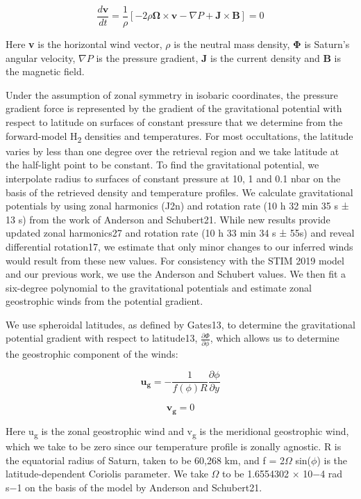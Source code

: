 \begin{equation}
	\frac{d\mathbf{v}}{dt} = \frac{1}{\rho} [-2 \rho \mathbf{\Omega} \times \mathbf{v} - \nabla P + \mathbf{J} \times \mathbf{B}] = 0
\end{equation}

Here \textbf{v} is the horizontal wind vector, $\rho$ is the neutral mass density, $\mathbf{\Phi}$ is Saturn’s angular velocity, $\nabla P$ is the pressure gradient, \textbf{J} is the current density and \textbf{B} is the magnetic field.

Under the assumption of zonal symmetry in isobaric coordinates, the pressure gradient force is represented by the gradient of the gravitational potential with respect to latitude on surfaces of constant pressure that we determine from the forward-model H\textsubscript{2} densities and temperatures. For most occultations, the latitude varies by less than one degree over the retrieval region and we take latitude at the half-light point to be constant. To find the gravitational potential, we interpolate radius to surfaces of constant pressure at 10, 1 and 0.1 nbar on the basis of the retrieved density and temperature profiles. We calculate gravitational potentials by using zonal harmonics (J2n) and rotation rate (10 h 32 min 35 s ± 13 s) from the work of Anderson and Schubert21. While new results provide updated zonal harmonics27 and rotation rate (10 h 33 min 34 s ± 55s) and reveal differential rotation17, we estimate that only minor changes to our inferred winds would result from these new values. For consistency with the STIM 2019 model and our previous work, we use the Anderson and Schubert values. We then fit a six-degree polynomial to the gravitational potentials and estimate zonal geostrophic winds from the potential gradient.

We use spheroidal latitudes, as defined by Gates13, to determine the gravitational potential gradient with respect to latitude13, $\frac{\partial\Phi}{\partial\phi}$, which allows us to determine the geostrophic component of the winds:

\begin{equation}
	\mathbf{u_g} = -\frac{1}{f({\phi})R}\frac{\partial \phi}{\partial y}
\end{equation}

\begin{equation}
	\mathbf{v_g} = 0
\end{equation}

Here u\textsubscript{g} is the zonal geostrophic wind and v\textsubscript{g} is the meridional geostrophic wind, which we take to be zero since our temperature profile is zonally agnostic. R is the equatorial radius of Saturn, taken to be 60,268 km, and f = 2$\Omega$ sin($\phi$) is the latitude-dependent Coriolis parameter. We take $\Omega$ to be 1.6554302 × 10−4 rad s−1 on the basis of the model by Anderson and Schubert21.

